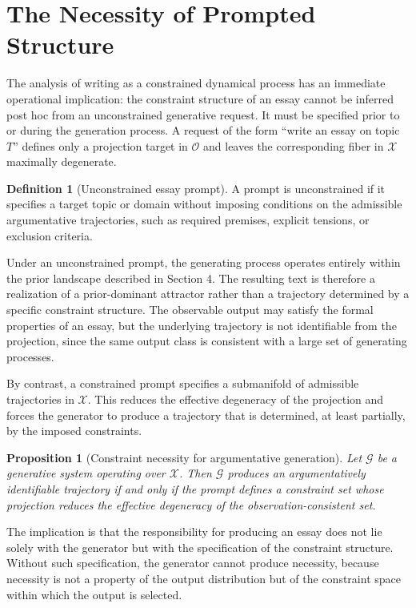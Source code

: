 \documentclass[12pt, oneside]{article}
\theoremstyle{plain}
\newtheorem{proposition}[theorem]{Proposition}
\theoremstyle{definition}
\newtheorem{definition}[theorem]{Definition}
\theoremstyle{remark}
\newcommand{\config}{\mathcal{X}}
\newcommand{\obs}{\mathcal{O}}
\begin{document}
\section{The Necessity of Prompted Structure}

The analysis of writing as a constrained dynamical process has an immediate operational
implication: the constraint structure of an essay cannot be inferred post hoc from an
unconstrained generative request. It must be specified prior to or during the generation
process. A request of the form ``write an essay on topic $T$'' defines only a projection
target in $\obs$ and leaves the corresponding fiber in $\config$ maximally degenerate.

\begin{definition}[Unconstrained essay prompt]
A prompt is unconstrained if it specifies a target topic or domain without imposing
conditions on the admissible argumentative trajectories, such as required premises,
explicit tensions, or exclusion criteria.
\end{definition}

Under an unconstrained prompt, the generating process operates entirely within the prior
landscape described in Section 4. The resulting text is therefore a realization of a
prior-dominant attractor rather than a trajectory determined by a specific constraint
structure. The observable output may satisfy the formal properties of an essay, but the
underlying trajectory is not identifiable from the projection, since the same output class
is consistent with a large set of generating processes.

By contrast, a constrained prompt specifies a submanifold of admissible trajectories in
$\config$. This reduces the effective degeneracy of the projection and forces the generator
to produce a trajectory that is determined, at least partially, by the imposed constraints.

\begin{proposition}[Constraint necessity for argumentative generation]
Let $\mathcal{G}$ be a generative system operating over $\config$. Then $\mathcal{G}$
produces an argumentatively identifiable trajectory if and only if the prompt defines a
constraint set whose projection reduces the effective degeneracy of the observation-consistent
set.
\end{proposition}

The implication is that the responsibility for producing an essay does not lie solely with
the generator but with the specification of the constraint structure. Without such
specification, the generator cannot produce necessity, because necessity is not a property
of the output distribution but of the constraint space within which the output is selected.
\end{document}
